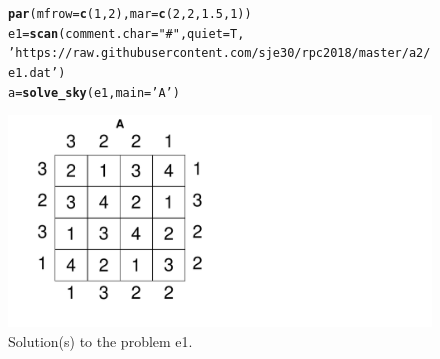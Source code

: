 \documentclass[12pt]{article}\usepackage[]{graphicx}\usepackage[]{color}
\makeatletter
\newcommand{\hlnum}[1]{\textcolor[rgb]{0.686,0.059,0.569}{#1}}%
\newcommand{\hlstr}[1]{\textcolor[rgb]{0.192,0.494,0.8}{#1}}%
\newcommand{\hlstd}[1]{\textcolor[rgb]{0.345,0.345,0.345}{#1}}%
\newcommand{\hlkwb}[1]{\textcolor[rgb]{0.69,0.353,0.396}{#1}}%
\newcommand{\hlkwc}[1]{\textcolor[rgb]{0.333,0.667,0.333}{#1}}%
\newcommand{\hlkwd}[1]{\textcolor[rgb]{0.737,0.353,0.396}{\textbf{#1}}}%
\newenvironment{kframe}{%
 \def\at@end@of@kframe{}%
 \ifinner\ifhmode%
  \def\at@end@of@kframe{\end{minipage}}%
  \begin{minipage}{\columnwidth}%
 \fi\fi%
 \def\FrameCommand##1{\hskip\@totalleftmargin \hskip-\fboxsep
 \colorbox{shadecolor}{##1}\hskip-\fboxsep
     \hskip-\linewidth \hskip-\@totalleftmargin \hskip\columnwidth}%
 \MakeFramed {\advance\hsize-\width
   \@totalleftmargin\z@ \linewidth\hsize
   \@setminipage}}%
 {\par\unskip\endMakeFramed%
 \at@end@of@kframe}
\newenvironment{knitrout}{}{} %
\makeatother
\begin{document}
\newpage

\begin{figure}[h!]
  \centering
\begin{knitrout}
\color{fgcolor}\begin{kframe}
\begin{alltt}
\hlkwd{par}\hlstd{(}\hlkwc{mfrow}\hlstd{=}\hlkwd{c}\hlstd{(}\hlnum{1}\hlstd{,}\hlnum{2}\hlstd{),}\hlkwc{mar}\hlstd{=}\hlkwd{c}\hlstd{(}\hlnum{2}\hlstd{,}\hlnum{2}\hlstd{,}\hlnum{1.5}\hlstd{,}\hlnum{1}\hlstd{))}
\hlstd{e1} \hlkwb{=} \hlkwd{scan}\hlstd{(}\hlkwc{comment.char}\hlstd{=}\hlstr{"#"}\hlstd{,} \hlkwc{quiet}\hlstd{=T,}
        \hlstr{'https://raw.githubusercontent.com/sje30/rpc2018/master/a2/e1.dat'}\hlstd{)}
\hlstd{a} \hlkwb{=} \hlkwd{solve_sky}\hlstd{(e1,} \hlkwc{main} \hlstd{=} \hlstr{'A'}\hlstd{)}
\end{alltt}
\end{kframe}
\includegraphics[width=.7\linewidth]{figure/unnamed-chunk-6-1} 

\end{knitrout}
\caption{Solution(s) to the problem e1.}
\label{fig:plot2}
\end{figure}
\end{document}
